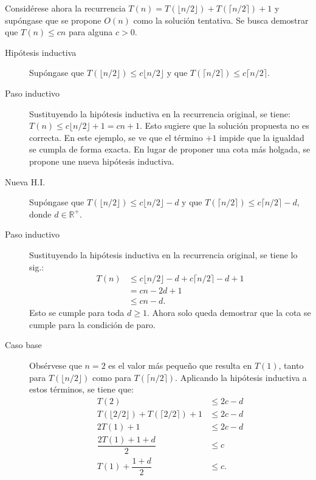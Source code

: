 \begin{expl}
    Considérese ahora la recurrencia \(T(n)=T(\lfloor n/2\rfloor)+T(\lceil n/2\rceil)+1\) y supóngase que se propone \(O(n)\) como la solución tentativa. 
    Se busca demostrar que \(T(n)\leq cn\) para alguna \(c>0\).
    \begin{description}
      \item[Hipótesis inductiva] Supóngase que \(T(\lfloor n/2\rfloor)\leq c\lfloor n/2\rfloor\) y que \(T(\lceil n/2\rceil)\leq c\lceil n/2\rceil\).
      \item[Paso inductivo] Sustituyendo la hipótesis inductiva en la recurrencia original, se tiene: \(T(n) \leq c\lfloor n/2 \rfloor + 1 = cn + 1\).
      Esto sugiere que la solución propuesta no es correcta.
      En este ejemplo, se ve que el término \(+1\) impide que la igualdad se cumpla de forma exacta.
      En lugar de proponer una cota más holgada, se propone une nueva hipótesis inductiva.
      \item[Nueva H.I.] Supóngase que \(T(\lfloor n/2\rfloor)\leq c\lfloor n/2\rfloor-d\) y que \(T(\lceil n/2\rceil)\leq c\lceil n/2\rceil-d\), donde \(d\in\mathbb{R}^+\).
      \item[Paso inductivo] Sustituyendo la hipótesis inductiva en la recurrencia original, se tiene lo sig.:
      \begin{align*}
        T(n) &\leq c\lfloor n/2\rfloor-d+c\lceil n/2\rceil-d+1\\
        &=cn-2d+1\\
        &\leq cn-d.
      \end{align*}
      Esto se cumple para toda \(d\geq 1\). 
      Ahora solo queda demostrar que la cota se cumple para la condición de paro.
      \item[Caso base] Obsérvese que \(n=2\) es el valor más pequeño que resulta en \(T(1)\), tanto para \(T(\lfloor n/2 \rfloor)\) como para \(T(\lceil n/2 \rceil)\). 
      Aplicando la hipótesis inductiva a estos términos, se tiene que:
      \begin{align*}
        T(2) &\leq 2c-d\\
        T(\lfloor 2/2 \rfloor) + T(\lceil 2/2 \rceil) + 1 &\leq 2c-d \\
        2T(1) + 1 &\leq 2c - d \\
        \dfrac{2T(1)+1+d}{2} &\leq c \\
        T(1) + \dfrac{1+d}{2} &\leq c.
      \end{align*}
      \exend
    \end{description}
\end{expl}

